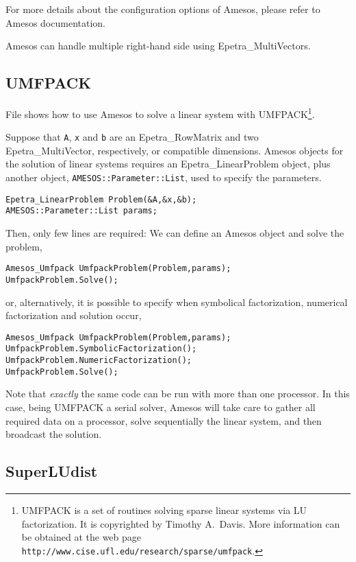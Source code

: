 For more details about the configuration options of Amesos, please refer
to Amesos documentation.

\begin{remark}
  Amesos can handle multiple right-hand side using Epetra\_MultiVectors.
\end{remark}


\subsection{UMFPACK}
\label{sec:umfpack}

File  shows how to use Amesos to solve a linear
system with UMFPACK\footnote{UMFPACK is a set of routines solving sparse
  linear systems via LU factorization. It is copyrighted by Timothy
  A.~Davis. More information can be obtained at the web page 
  {\tt http://www.cise.ufl.edu/research/sparse/umfpack}. }.

Suppose that \verb!A!, \verb!x! and \verb!b! are an Epetra\_RowMatrix
and two Epetra\_MultiVector, respectively, or compatible dimensions.
Amesos objects for the solution of linear systems requires an
Epetra\_LinearProblem object, plus another object,
\verb!AMESOS::Parameter::List!, used to specify the parameters.
\begin{verbatim}
Epetra_LinearProblem Problem(&A,&x,&b);
AMESOS::Parameter::List params;
\end{verbatim}
Then, only few lines are required: We can define an Amesos object and
solve the problem,
\begin{verbatim}
Amesos_Umfpack UmfpackProblem(Problem,params);
UmfpackProblem.Solve();
\end{verbatim}
or, alternatively, it is possible to specify when symbolical
factorization, numerical factorization and solution occur,
\begin{verbatim}
Amesos_Umfpack UmfpackProblem(Problem,params); 
UmfpackProblem.SymbolicFactorization();
UmfpackProblem.NumericFactorization();
UmfpackProblem.Solve();
\end{verbatim}
Note that {\sl exactly} the same code can be run with more than one
processor. In this case, being UMFPACK a serial solver, Amesos will take
care to gather all required data on a processor, solve sequentially
the linear system, and then broadcast the solution.


\subsection{SuperLUdist}
\label{sec:superludist}

